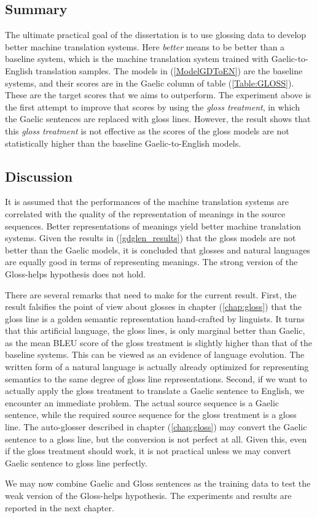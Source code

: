 \subsection{Summary}
The ultimate practical goal of the dissertation is to use glossing data to develop better machine translation systems. Here \textit{better} means to be better than a baseline system, which is the machine translation system trained with Gaelic-to-English translation samples. The models in (\ref{ModelGDToEN}) are the baseline systems, and their scores are in the Gaelic column of table (\ref{Table:GLOSS}). These are the target scores that we aims to outperform. The experiment above is the first attempt to improve that scores by using the \textit{gloss treatment}, in which the Gaelic sentences are replaced with gloss lines.  However, the result shows that this \textit{gloss treatment} is not effective as the scores of the gloss models are not statistically higher than the baseline Gaelic-to-English models. 

\subsection{Discussion}
It is assumed that the performances of the machine translation systems are correlated with the quality of the representation of meanings in the source sequences. Better representations of meanings yield better machine translation systems. Given the results in (\ref{gdglen_results}) that the gloss models are not better than the Gaelic models, it is concluded that glosses and natural languages are equally good in terms of representing meanings. The strong version of the Gloss-helps hypothesis does not hold.

There are several remarks that need to make for the current result. First, the result falsifies the point of view about glosses in chapter (\ref{chap:gloss}) that the gloss line is a golden semantic representation hand-crafted by linguists.
It turns that this artificial language, the gloss lines, is only marginal better than Gaelic, as the mean BLEU score of the gloss treatment is slightly higher than that of the baseline systems. This can be viewed as an evidence of language evolution.
The written form of a natural language is actually already optimized for representing semantics to the same degree of gloss line representations.
Second, if we want to actually apply the gloss treatment to translate a Gaelic sentence to English, we encounter an immediate problem. The actual source sequence is a Gaelic sentence, while the required source sequence for the gloss treatment is a gloss line. The auto-glosser described in chapter (\ref{chap:gloss}) may convert the Gaelic sentence to a gloss line, but the conversion is not perfect at all. Given this, even if the gloss treatment should work, it is not practical unless we may convert Gaelic sentence to gloss line perfectly.      

We may now combine Gaelic and Gloss sentences as the training data to test the weak version of the Gloss-helps hypothesis. The experiments and results are reported in the next chapter.
